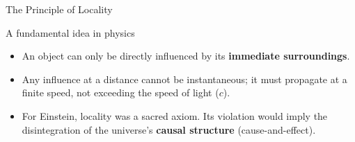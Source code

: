 \begin{frame}{The Principle of Locality}

  \begin{block}{A fundamental idea in physics}
    \begin{itemize}[<+->] %
      \item An object can only be directly influenced by its \textbf{immediate surroundings}.
      \item Any influence at a distance cannot be instantaneous; it must propagate at a finite speed, not exceeding the speed of light ($c$).
      \item For Einstein, locality was a sacred axiom. Its violation would imply the disintegration of the universe's \textbf{causal structure} (cause-and-effect).
    \end{itemize}
  \end{block}

\end{frame}

